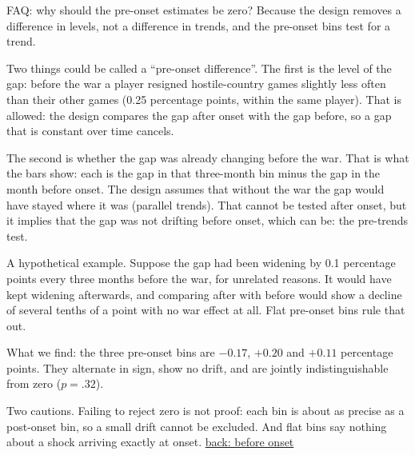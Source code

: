 \documentclass[aspectratio=169,11pt,t]{beamer}
\newcommand{\backto}[2]{\vfill\hfill\hyperlink{#1}{\textcolor{linkblue}{\scriptsize\textsf{back: #2}}}}
\begin{document}
\begin{frame}[label=faq-pretrends]{FAQ: why should the pre-onset estimates be zero?}
  \footnotesize
  Because the design removes a difference in levels, not a difference in trends, and the pre-onset bins test for a trend.

  Two things could be called a ``pre-onset difference''. The first is the level of the gap: before the war a player resigned hostile-country games slightly less often than their other games (0.25 percentage points, within the same player). That is allowed: the design compares the gap after onset with the gap before, so a gap that is constant over time cancels.

  The second is whether the gap was already changing before the war. That is what the bars show: each is the gap in that three-month bin minus the gap in the month before onset. The design assumes that without the war the gap would have stayed where it was (parallel trends). That cannot be tested after onset, but it implies that the gap was not drifting before onset, which can be: the pre-trends test.

  A hypothetical example. Suppose the gap had been widening by 0.1 percentage points every three months before the war, for unrelated reasons. It would have kept widening afterwards, and comparing after with before would show a decline of several tenths of a point with no war effect at all. Flat pre-onset bins rule that out.

  What we find: the three pre-onset bins are $-0.17$, $+0.20$ and $+0.11$ percentage points. They alternate in sign, show no drift, and are jointly indistinguishable from zero ($p = .32$).

  Two cautions. Failing to reject zero is not proof: each bin is about as precise as a post-onset bin, so a small drift cannot be excluded. And flat bins say nothing about a shock arriving exactly at onset.
  \backto{before}{before onset}
\end{frame}
\end{document}
